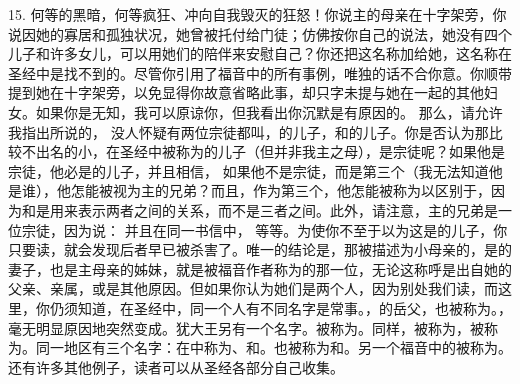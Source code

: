 15. 何等的黑暗，何等疯狂、冲向自我毁灭的狂怒！你说主的母亲在十字架旁，你说因她的寡居和孤独状况，她曾被托付给门徒；仿佛按你自己的说法，她没有四个儿子和许多女儿，可以用她们的陪伴来安慰自己？你还把这名称加给她，这名称在圣经中是找不到的。尽管你引用了福音中的所有事例，唯独的话不合你意。你顺带提到她在十字架旁，以免显得你故意省略此事，却只字未提与她在一起的其他妇女。如果你是无知，我可以原谅你，但我看出你沉默是有原因的。\newline{} 那么，请允许我指出所说的，  没人怀疑有两位宗徒都叫，的儿子，和的儿子。你是否认为那比较不出名的小，在圣经中被称为的儿子（但并非我主之母），是宗徒呢？如果他是宗徒，他必是的儿子，并且相信， 如果他不是宗徒，而是第三个（我无法知道他是谁），他怎能被视为主的兄弟？而且，作为第三个，他怎能被称为以区别于，因为和是用来表示两者之间的关系，而不是三者之间。此外，请注意，主的兄弟是一位宗徒，因为说：  并且在同一书信中， 等等。为使你不至于以为这是的儿子，你只要读，就会发现后者早已被杀害了。唯一的结论是，那被描述为小母亲的，是的妻子，也是主母亲的姊妹，就是被福音作者称为的那一位，无论这称呼是出自她的父亲、亲属，或是其他原因。但如果你认为她们是两个人，因为别处我们读，而这里，你仍须知道，在圣经中，同一个人有不同名字是常事。，的岳父，也被称为。，毫无明显原因地突然变成。犹大王另有一个名字。被称为。同样，被称为，被称为。同一地区有三个名字：在中称为、和。也被称为和。另一个福音中的被称为。还有许多其他例子，读者可以从圣经各部分自己收集。\par

